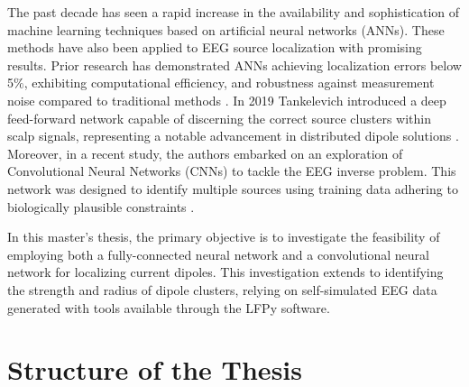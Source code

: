 \documentclass[a4paper, UKenglish, 11pt]{uiomaster}
\begin{document}
The past decade has seen a rapid increase in the availability and sophistication of machine learning techniques based on artificial neural networks (ANNs). These methods have also been applied to EEG source localization with promising results. Prior research has demonstrated ANNs achieving localization errors below 5$\%$, exhibiting computational efficiency, and robustness against measurement noise compared to traditional methods \cite{van2000eeg}. In 2019 Tankelevich introduced a deep feed-forward network capable of discerning the correct source clusters within scalp signals, representing a notable advancement in distributed dipole solutions \cite{tankelevich2019inverse}. Moreover, in a recent study, the authors embarked on an exploration of Convolutional Neural Networks (CNNs) to tackle the EEG inverse problem. This network was designed to identify multiple sources using training data adhering to biologically plausible constraints \cite{hecker2021convdip}.

In this master's thesis, the primary objective is to investigate the feasibility of employing both a fully-connected neural network and a convolutional neural network for localizing current dipoles. This investigation extends to identifying the strength and radius of dipole clusters, relying on self-simulated EEG data generated with tools available through the LFPy software.





\section{Structure of the Thesis}
\end{document}
